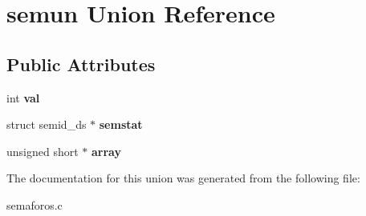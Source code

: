 \hypertarget{unionsemun}{}\section{semun Union Reference}
\label{unionsemun}
\subsection*{Public Attributes}
\begin{DoxyCompactItemize}
\item 
\mbox{\label{unionsemun_ac6121ecb6d04a024e07e12bd71b94031}} 
int {\bfseries val}
\item 
\mbox{\label{unionsemun_afb976847aea44952be2118ad0329d832}} 
struct semid\+\_\+ds $\ast$ {\bfseries semstat}
\item 
\mbox{\label{unionsemun_aca23b8e730a0553205813c0cb7692b54}} 
unsigned short $\ast$ {\bfseries array}
\end{DoxyCompactItemize}


The documentation for this union was generated from the following file\+:\begin{DoxyCompactItemize}
\item 
semaforos.\+c\end{DoxyCompactItemize}
